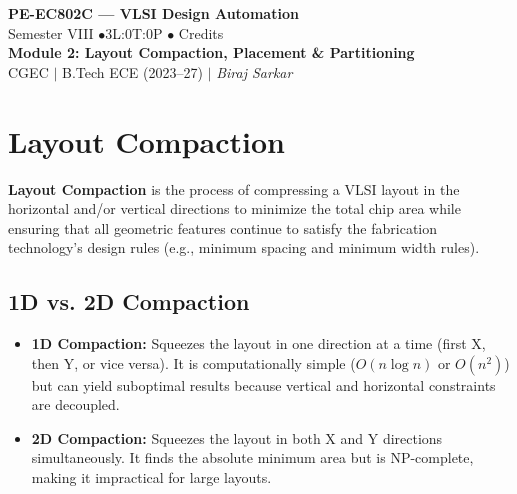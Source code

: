 \documentclass[12pt,a4paper]{article}
\begin{document}

\begin{center}
  {\LARGE\bfseries\color{myred} PE-EC802C --- VLSI Design Automation}\\[5pt]
  {\normalsize\color{mydark} Semester VIII \quad$\bullet$\quad 3L:0T:0P \quad$\bullet$ Credits}\\[3pt]
  {\normalsize\color{myteal}\textbf{Module 2: Layout Compaction, Placement \& Partitioning}}\\[3pt]
  {\small\color{mydark} CGEC \;$|$\; B.Tech ECE (2023--27) \;$|$\; \textit{Biraj Sarkar}}
\end{center}
\vspace{2pt}
\noindent{\color{myred}\rule{\linewidth}{1.5pt}}
\vspace{2pt}

\hypersetup{linkcolor=mydark}
\tableofcontents
\hypersetup{linkcolor=myteal}
\newpage

\section{Layout Compaction}

\begin{tcolorbox}[defbox, title={Layout Compaction}]
  \textbf{Layout Compaction} is the process of compressing a VLSI layout in the horizontal and/or vertical directions to minimize the total chip area while ensuring that all geometric features continue to satisfy the fabrication technology's design rules (e.g., minimum spacing and minimum width rules).
\end{tcolorbox}

\subsection{1D vs. 2D Compaction}
\begin{itemize}[leftmargin=*, itemsep=2pt]
  \item \textbf{1D Compaction:} Squeezes the layout in one direction at a time (first X, then Y, or vice versa). It is computationally simple ($O(n \log n)$ or $O(n^2)$) but can yield suboptimal results because vertical and horizontal constraints are decoupled.
  \item \textbf{2D Compaction:} Squeezes the layout in both X and Y directions simultaneously. It finds the absolute minimum area but is NP-complete, making it impractical for large layouts.
\end{itemize}
\end{document}
